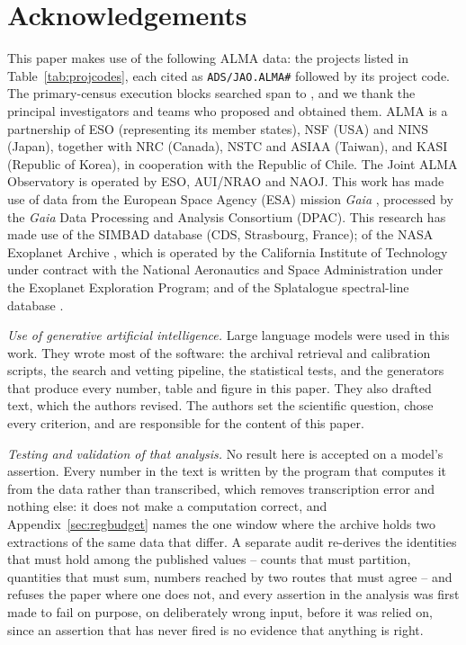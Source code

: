 \section*{Acknowledgements}
This paper makes use of the following ALMA data: the \NProjCodes{} projects
listed in Table~\ref{tab:projcodes}, each cited as \texttt{ADS/JAO.ALMA\#}
followed by its project code. The \NEB{} primary-census execution blocks
searched span \PrEbDateFirst{} to \PrEbDateLast{}, and we thank the principal
investigators and teams who proposed and obtained
them.\ProjCodeUnresClause{} ALMA is a partnership of ESO
(representing its member states), NSF (USA) and NINS (Japan), together with NRC
(Canada), NSTC and ASIAA (Taiwan), and KASI (Republic of Korea), in cooperation
with the Republic of Chile. The Joint ALMA Observatory is operated by ESO,
AUI/NRAO and NAOJ. This work has made use of data from the European Space
Agency (ESA) mission {\it Gaia} \citep{GaiaDR3}, processed by the {\it Gaia}
Data Processing and Analysis Consortium (DPAC). This research has made use
of the SIMBAD database \citep{SIMBAD2000} (CDS, Strasbourg, France); of the
NASA Exoplanet Archive \citep{NEA2013}, which is operated by the California
Institute of Technology under contract with the National Aeronautics and
Space Administration under the Exoplanet Exploration Program; and of the
Splatalogue spectral-line database \citep{Splatalogue2007}.

\emph{Use of generative artificial intelligence.} Large language models were
used in this work. They wrote most of the software: the archival retrieval and
calibration scripts, the search and vetting pipeline, the statistical tests,
and the generators that produce every number, table and figure in this paper.
They also drafted text, which the authors revised. The authors set the
scientific question, chose every criterion, and are responsible for the
content of this paper.

\emph{Testing and validation of that analysis.} No result here is accepted
on a model's assertion. Every number in the text is written by the program
that computes it from the data rather than transcribed, which removes
transcription error and nothing else: it does not make a computation correct,
and Appendix~\ref{sec:regbudget} names the one window where the archive holds
two extractions of the same data that differ. A separate audit re-derives the
identities that must hold among the published values -- counts that must
partition, quantities that must sum, numbers reached by two routes that must
agree -- and refuses the paper where one does not, and every assertion in the
analysis was first made to fail on purpose, on deliberately wrong input,
before it was relied on, since an assertion that has never fired is no
evidence that anything is right.

